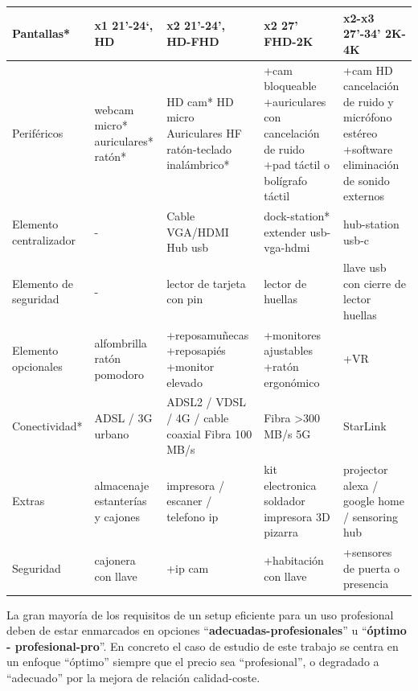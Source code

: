\begin{table}[!htbp]
\begin{center}
{\begin{tabular}{|p{3.5cm}|p{3cm}|p{3cm}|p{3cm}|p{3cm}|}
        Pantallas* & x1 21'-24‘, HD & x2 21’-24', HD-FHD & x2 27’ FHD-2K & x2-x3 27’-34’ 2K-4K \\ \hline

        Periféricos & webcam micro* auriculares* ratón* & HD cam* HD micro Auriculares HF ratón-teclado inalámbrico*  & +cam bloqueable +auriculares con cancelación de ruido +pad táctil o bolígrafo táctil  & +cam HD cancelación de ruido y micrófono estéreo +software eliminación de sonido externos \\ \hline

        Elemento centralizador & - & Cable VGA/HDMI Hub usb & dock-station* extender usb-vga-hdmi  & hub-station usb-c  \\ \hline
        
        Elemento de seguridad & - & lector de tarjeta con pin & lector de huellas & llave usb con cierre de lector huellas  \\ \hline
        
        Elemento opcionales & alfombrilla ratón pomodoro & +reposamuñecas +reposapiés +monitor elevado & +monitores ajustables +ratón ergonómico & +VR \\ \hline
        
        Conectividad* & ADSL / 3G urbano & ADSL2 / VDSL / 4G / cable coaxial Fibra 100 MB/s  & Fibra >300 MB/s 5G & StarLink \\ \hline
        
        Extras & almacenaje estanterías y cajones & impresora / escaner / telefono ip & kit electronica soldador impresora 3D pizarra & projector alexa / google home / sensoring hub \\ \hline
        
        Seguridad & cajonera con llave & +ip cam & +habitación con llave & +sensores de puerta o presencia \\ \hline
       
    \end{tabular}
}
\end{center}
\end{table}

La gran mayoría de los requisitos de un setup eficiente para un uso profesional deben de estar enmarcados en opciones “\textbf{adecuadas-profesionales}” u “\textbf{óptimo - profesional-pro}”. En concreto el caso de estudio de este trabajo se centra en un enfoque “óptimo” siempre que el precio sea “profesional”, o degradado a “adecuado” por la mejora de relación calidad-coste.


